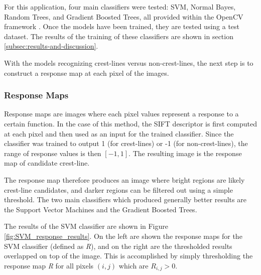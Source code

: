For this application, four main classifiers were tested: SVM, Normal Bayes, Random Trees, and Gradient Boosted Trees, all provided within the OpenCV framework \cite{opencv_library}. Once the models have been trained, they are tested using a test dataset. The results of the training of these classifiers are shown in section \ref{subsec:results-and-discussion}.

With the models recognizing crest-lines versus non-crest-lines, the next step is to construct a response map at each pixel of the images.

\subsubsection{Response Maps} \label{subsubsec:response_maps}

Response maps are images where each pixel values represent a response to a certain function. In the case of this method, the SIFT descriptor is first computed at each pixel and then used as an input for the trained classifier. Since the classifier was trained to output 1 (for crest-lines) or -1 (for non-crest-lines), the range of response values is then $[-1, 1]$. The resulting image is the response map of candidate crest-line.

The response map therefore produces an image where bright regions are likely crest-line candidates, and darker regions can be filtered out using a simple threshold. The two main classifiers which produced generally better results are the Support Vector Machines and the Gradient Boosted Trees. 

The results of the SVM classifier are shown in Figure \ref{fig:SVM_response_results}. On the left are shown the response maps for the SVM classifier (defined as \emph{R}), and on the right are the thresholded results overlapped on top of the image. This is accomplished by simply thresholding the response map \emph{R} for all pixels $(i,j)$ which are $R_{i,j} > 0$. 

